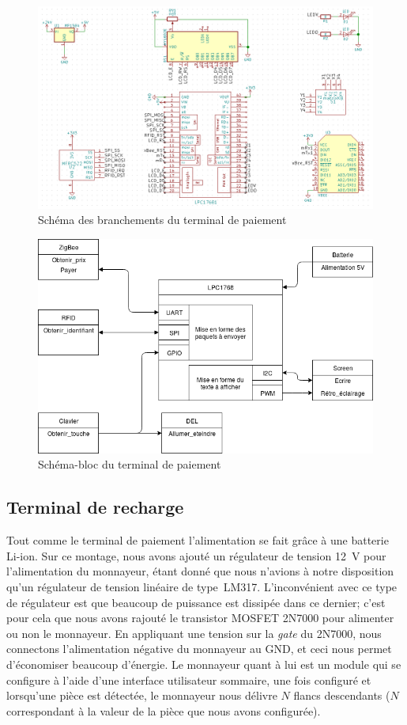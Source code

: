 	\begin{figure}[p]
		\includegraphics[width=\textwidth]{Pictures/Branchements/Terminal_Paiement}
		\caption{Schéma des branchements du terminal de paiement}
		\label{fig.branchPaiement}
	\end{figure}

	\begin{figure}[p]
		\includegraphics[width=\textwidth]{Pictures/Branchements/Paiement_Bloc}
		\caption{Schéma-bloc du terminal de paiement}
		\label{fig.blocPaiement}
	\end{figure}
		
	\subsection{Terminal de recharge}
	Tout comme le terminal de paiement l’alimentation se fait grâce à une batterie Li-ion. Sur ce montage, nous avons ajouté un régulateur de tension 12~V pour l’alimentation du monnayeur, étant donné que nous n’avions à notre disposition qu’un régulateur de tension linéaire de type~LM317. L'inconvénient avec ce type de régulateur est que beaucoup de puissance est dissipée dans ce dernier; c’est pour cela que nous avons rajouté le transistor MOSFET 2N7000 pour alimenter ou non le monnayeur. En appliquant une tension sur la \emph{gate} du 2N7000, nous connectons l’alimentation négative du monnayeur au GND, et ceci nous permet d'économiser beaucoup d’énergie. Le monnayeur quant à lui est un module qui se configure à l’aide d’une interface utilisateur sommaire, une fois configuré et lorsqu’une pièce est détectée, le monnayeur nous délivre $N$ flancs descendants ($N$ correspondant à la valeur de la pièce que nous avons configurée).

